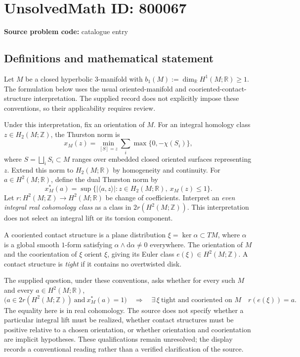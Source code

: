 \documentclass[11pt]{article}
\newcommand{\Z}{\mathbb{Z}}
\newcommand{\R}{\mathbb{R}}
\begin{document}
\section*{UnsolvedMath ID: 800067}
\textbf{Source problem code:} catalogue entry
\subsection{Definitions and mathematical statement}
Let \(M\) be a closed hyperbolic \(3\)-manifold with \(b_1(M):=\dim_{\R}H^1(M;\R)\geq 1\). The formulation below uses the usual oriented-manifold and cooriented-contact-structure interpretation. The supplied record does not explicitly impose these conventions, so their applicability requires review.

Under this interpretation, fix an orientation of \(M\). For an integral homology class \(z\in H_2(M;\Z)\), the Thurston norm is
\[
x_M(z)=\min_{[S]=z}\sum_i\max\{0,-\chi(S_i)\},
\]
where \(S=\bigsqcup_i S_i\subset M\) ranges over embedded closed oriented surfaces representing \(z\). Extend this norm to \(H_2(M;\R)\) by homogeneity and continuity. For \(a\in H^2(M;\R)\), define the dual Thurston norm by
\[
x_M^*(a)=\sup\bigl\{|\langle a,z\rangle|:z\in H_2(M;\R),\ x_M(z)\leq 1\bigr\}.
\]
Let \(r:H^2(M;\Z)\to H^2(M;\R)\) be change of coefficients. Interpret an \emph{even integral real cohomology class} as a class in \(2r(H^2(M;\Z))\). This interpretation does not select an integral lift or its torsion component.

A cooriented contact structure is a plane distribution \(\xi=\ker\alpha\subset TM\), where \(\alpha\) is a global smooth \(1\)-form satisfying \(\alpha\wedge\mathrm d\alpha\neq 0\) everywhere. The orientation of \(M\) and the coorientation of \(\xi\) orient \(\xi\), giving its Euler class \(e(\xi)\in H^2(M;\Z)\). A contact structure is \emph{tight} if it contains no overtwisted disk.

The supplied question, under these conventions, asks whether for every such \(M\) and every \(a\in H^2(M;\R)\),
\[
\bigl(a\in 2r(H^2(M;\Z))\ \text{and}\ x_M^*(a)=1\bigr)
\quad\Longrightarrow\quad
\exists\,\xi\ \text{tight and cooriented on }M
\quad r(e(\xi))=a.
\]
The equality here is in real cohomology. The source does not specify whether a particular integral lift must be realized, whether contact structures must be positive relative to a chosen orientation, or whether orientation and coorientation are implicit hypotheses. These qualifications remain unresolved; the display records a conventional reading rather than a verified clarification of the source.
\end{document}
